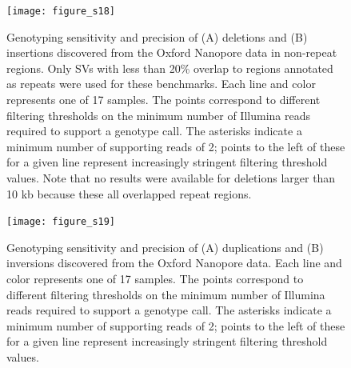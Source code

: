 \documentclass[12pt]{article}
\newenvironment{cfigure}
	{\begin{figure} \centering}
	{\end{figure}}
\newenvironment{lsfigure}
	{\begin{landscape} \begin{figure} \centering}
	{\end{figure} \end{landscape}}
\begin{document}
\begin{lsfigure}
		\texttt{[image: figure\_s18]}

		\caption[Sensitivity and precision of Oxford Nanopore deletion and insertion genotyping in non-repeat regions]{
			Genotyping sensitivity and precision of (A) deletions and (B) insertions discovered from the Oxford Nanopore data in non-repeat regions. 
			Only SVs with less than 20\% overlap to regions annotated as repeats were used for these benchmarks. 
			Each line and color represents one of 17 samples. 
		The points correspond to different filtering thresholds on the minimum number of Illumina reads required to support a genotype call.
			The asterisks indicate a minimum number of supporting reads of 2; points to the left of these for a given line represent increasingly stringent filtering threshold values.
			Note that no results were available for deletions larger than 10 kb because these all overlapped repeat regions.
	}

		\label{fig_s18}
\end{lsfigure}

\clearpage%

\begin{cfigure}
	\texttt{[image: figure\_s19]}

	\caption[Sensitivity and precision of Oxford Nanopore duplication and inversion genotyping]{
		Genotyping sensitivity and precision of (A) duplications and (B) inversions discovered from the Oxford Nanopore data. 
		Each line and color represents one of 17 samples. 
		The points correspond to different filtering thresholds on the minimum number of Illumina reads required to support a genotype call.
		The asterisks indicate a minimum number of supporting reads of 2; points to the left of these for a given line represent increasingly stringent filtering threshold values.
	}

	\label{fig_s19}

\end{cfigure}

\clearpage%
\end{document}
